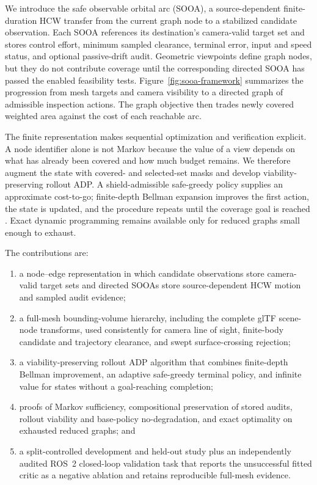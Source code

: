 \documentclass{IEEEtaes}
\theoremstyle{remark}
\theoremstyle{plain}
\begin{document}
We introduce the safe observable orbital arc (SOOA), a source-dependent finite-duration HCW transfer from the current graph node to a stabilized candidate observation. Each SOOA references its destination's camera-valid target set and stores control effort, minimum sampled clearance, terminal error, input and speed status, and optional passive-drift audit. Geometric viewpoints define graph nodes, but they do not contribute coverage until the corresponding directed SOOA has passed the enabled feasibility tests. Figure~\ref{fig:sooa-framework} summarizes the progression from mesh targets and camera visibility to a directed graph of admissible inspection actions. The graph objective then trades newly covered weighted area against the cost of each reachable arc.

The finite representation makes sequential optimization and verification explicit. A node identifier alone is not Markov because the value of a view depends on what has already been covered and how much budget remains. We therefore augment the state with covered- and selected-set masks and develop viability-preserving rollout ADP. A shield-admissible safe-greedy policy supplies an approximate cost-to-go; finite-depth Bellman expansion improves the first action, the state is updated, and the procedure repeats until the coverage goal is reached \cite{bertsekas2020rollout}. Exact dynamic programming remains available only for reduced graphs small enough to exhaust.

The contributions are:
\begin{enumerate}
  \item a node--edge representation in which candidate observations store camera-valid target sets and directed SOOAs store source-dependent HCW motion and sampled audit evidence;
  \item a full-mesh bounding-volume hierarchy, including the complete glTF scene-node transforms, used consistently for camera line of sight, finite-body candidate and trajectory clearance, and swept surface-crossing rejection;
  \item a viability-preserving rollout ADP algorithm that combines finite-depth Bellman improvement, an adaptive safe-greedy terminal policy, and infinite value for states without a goal-reaching completion;
  \item proofs of Markov sufficiency, compositional preservation of stored audits, rollout viability and base-policy no-degradation, and exact optimality on exhausted reduced graphs; and
  \item a split-controlled development and held-out study plus an independently audited ROS~2 closed-loop validation task that reports the unsuccessful fitted critic as a negative ablation and retains reproducible full-mesh evidence.
\end{enumerate}
\end{document}
